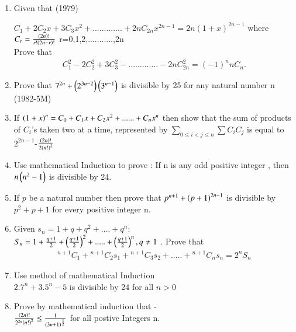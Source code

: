 \documentclass[journal,12pt,twocolumn]{IEEEtran}
\theoremstyle{remark}
\begin{document}
    
     \begin{enumerate}
		
             \item Given that  \hfill{(1979)}
		      
		$C_1+2C_2x+3C_3x^2+.............+2nC_{2n}x^{2n-1}= 2n(1+x)^{2n-1}$
		where$ C_r =\frac{\left(2n\right)!}{r!\left(2n-r\right)!}$ r=0,1,2,...........,2n\\
		          Prove that  \begin{align*} 
		     C^2_1-2C_2^2+3C_3^2-.............-2nC_{2n}^2  = (-1)^nnC_n. 
		     \end{align*}  

	      \item Prove that $ 7^{2n} + \left(2^{3n-2}\right)  \left(3^{n-1}\right) $ is divisible by 25 for any natural number n \hfill{(1982-5M)}  


             \item If $ \left(1+x\right)^n= C_0 + C_1x +C_2x^2+......+C_nx^n $ then show that the sum of products of $ C_i $'s taken
	   two at a time, represented by $ \displaystyle\sum_{0 \leq i<j \leq n} \displaystyle\sum C_i C_j $ is equal to $ 2^{2n-1}$-$\frac{\left(2n\right)!} {2\left(n!\right)^2} $ \hfill{}

	     \item Use mathematical Induction to prove : If n is any odd positive integer , then  $ n\left(n^2-1\right) $ is divisible by 24. \hfill{}


	    \item If $ p $ be a natural number then prove that $ p^{n+1}+\left(p+1\right)^{2n-1} $ is divisible by $ p^2+p+1 $ for every positive integer n. \hfill{} 

            \item Given  $ s_n = 1 + q + q^2 +....+q^n;$\\
		    $ S_n = 1 + \frac{q+1}{2}+\left(\frac{q+1}{2}\right)^2+.....+\left(\frac{q+1}{2}\right)^n,q\neq1 $ . Prove that	\begin{align*} 
		    {}^{n+1}C_1+{}^{n+1}C_2s_1+{}^{n+1}C_3s_2+.....+{}^{n+1}C_ns_n=2^nS_n
		    \end{align*}    \hfill{}


	    \item Use method of mathematical Induction \\ $ 2.7^n +3.5^n-5 $ is divisible by 24 for all $ n>0 $ \hfill{}


	    \item Prove by mathematical induction that -\\
		    $ \frac{\left(2n\right)!}{2^{2n}\left(n!\right)^2}\leq \frac{1}{\left(3n+1\right)^{\frac{1}{2}}} $  for all postive Integers n.\hfill {}



\end{enumerate}
\end{document}
